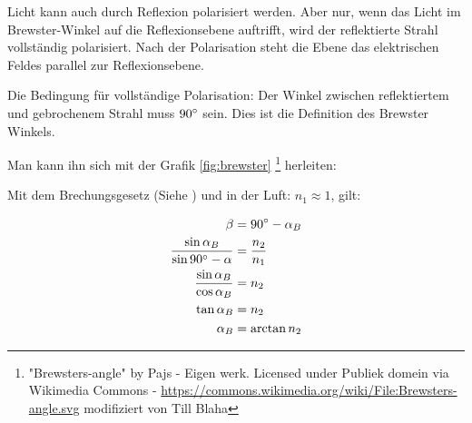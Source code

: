 Licht kann auch durch Reflexion polarisiert werden. Aber nur, wenn das Licht im Brewster-Winkel auf die Reflexionsebene auftrifft, wird der reflektierte Strahl vollständig polarisiert. Nach der Polarisation steht die Ebene das elektrischen Feldes parallel zur Reflexionsebene.

Die Bedingung für vollständige Polarisation: Der Winkel zwischen reflektiertem und gebrochenem Strahl muss $90\degree$ sein. Dies ist die Definition des Brewster Winkels.

Man kann ihn sich mit der Grafik \ref{fig:brewster} \footnote{"Brewsters-angle" by Pajs - Eigen werk. Licensed under Publiek domein via Wikimedia Commons - \url{https://commons.wikimedia.org/wiki/File:Brewsters-angle.svg} modifiziert von Till Blaha} herleiten:

Mit dem Brechungsgesetz (Siehe ) und in der Luft: $n_1 \approx 1$, gilt:

\begin{align}
\begin{split}
	\beta &= 90\degree - \alpha_B \\
	\frac{\sin{\alpha_B}}{\sin{90\degree - \alpha}} &= \frac{n_2}{n_1} \\
	\frac{\sin{\alpha_B}}{\cos{\alpha_B}} &= n_2 \\
	\tan{\alpha_B} &= n_2 \\
	\alpha_B &= \arctan{n_2}
\end{split}
\end{align}